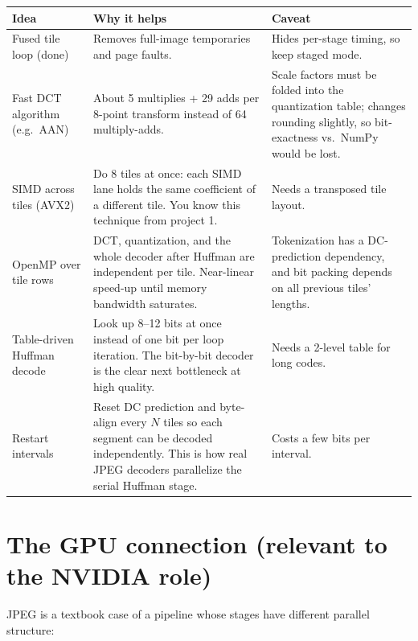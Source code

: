 \begin{center}
\small
\begin{tabular}{@{}p{3.6cm}p{6.2cm}p{4.8cm}@{}}
\toprule
\textbf{Idea} & \textbf{Why it helps} & \textbf{Caveat}\\ \midrule
Fused tile loop (done) & Removes full-image temporaries and page faults. & Hides per-stage timing, so keep staged mode.\\
Fast DCT algorithm (e.g.\ AAN) & About 5 multiplies + 29 adds per 8-point transform instead of 64 multiply-adds. & Scale factors must be folded into the quantization table; changes rounding slightly, so bit-exactness vs.\ NumPy would be lost.\\
SIMD across tiles (AVX2) & Do 8 tiles at once: each SIMD lane holds the same coefficient of a different tile. You know this technique from project 1. & Needs a transposed tile layout.\\
OpenMP over tile rows & DCT, quantization, and the whole decoder after Huffman are independent per tile. Near-linear speed-up until memory bandwidth saturates. & Tokenization has a DC-prediction dependency, and bit packing depends on all previous tiles' lengths.\\
Table-driven Huffman decode & Look up 8--12 bits at once instead of one bit per loop iteration. The bit-by-bit decoder is the clear next bottleneck at high quality. & Needs a 2-level table for long codes.\\
Restart intervals & Reset DC prediction and byte-align every $N$ tiles so each segment can be decoded independently. This is how real JPEG decoders parallelize the serial Huffman stage. & Costs a few bits per interval.\\
\bottomrule
\end{tabular}
\end{center}

\section{The GPU connection (relevant to the NVIDIA role)}

JPEG is a textbook case of a pipeline whose stages have different parallel structure:

